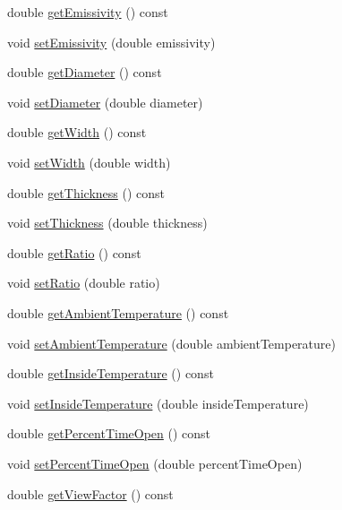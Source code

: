 \begin{DoxyCompactItemize}
\item 
double \hyperlink{class_opening_losses_a7eaf8e68f268e8ff1671c5f9f0462b4f}{get\+Emissivity} () const
\item 
void \hyperlink{class_opening_losses_aa63eb1c2ba9057d401f3a7f5dd974afe}{set\+Emissivity} (double emissivity)
\item 
double \hyperlink{class_opening_losses_a8ed643300b0f5b606be6cd669cd413c3}{get\+Diameter} () const
\item 
void \hyperlink{class_opening_losses_ab840ba51788e83c0b1dc9b8c05b1eadb}{set\+Diameter} (double diameter)
\item 
double \hyperlink{class_opening_losses_a0374aeac5532188358b5f6ad0f120305}{get\+Width} () const
\item 
void \hyperlink{class_opening_losses_a5ee8c514917c16ecd2c63caecc98e1c6}{set\+Width} (double width)
\item 
double \hyperlink{class_opening_losses_aeefdf4431056de65ca84c6dfb24b61e1}{get\+Thickness} () const
\item 
void \hyperlink{class_opening_losses_a221cc88072e4f0975f15c6cd96781dea}{set\+Thickness} (double thickness)
\item 
double \hyperlink{class_opening_losses_ac9f7dbd2cc023932b5d8076a21a3f690}{get\+Ratio} () const
\item 
void \hyperlink{class_opening_losses_aab7f82f24511c37f0bc4b29cbc7239b5}{set\+Ratio} (double ratio)
\item 
double \hyperlink{class_opening_losses_a198f46508744d6943846ea95a9513a45}{get\+Ambient\+Temperature} () const
\item 
void \hyperlink{class_opening_losses_a3624c9fad2a413871b7324f7e957a5ae}{set\+Ambient\+Temperature} (double ambient\+Temperature)
\item 
double \hyperlink{class_opening_losses_abe930dab77b1c855503ee51fdf66c88a}{get\+Inside\+Temperature} () const
\item 
void \hyperlink{class_opening_losses_a895dcaa81bbb3dc823ec903480f05262}{set\+Inside\+Temperature} (double inside\+Temperature)
\item 
double \hyperlink{class_opening_losses_aeefc3790a569008ff2e804033a9efea3}{get\+Percent\+Time\+Open} () const
\item 
void \hyperlink{class_opening_losses_a889b6aa25bf6d8fc8fb284ec0c2a1625}{set\+Percent\+Time\+Open} (double percent\+Time\+Open)
\item 
double \hyperlink{class_opening_losses_ae6633fab7a941e00b9770bee6a3af34d}{get\+View\+Factor} () const

\end{DoxyCompactItemize}
